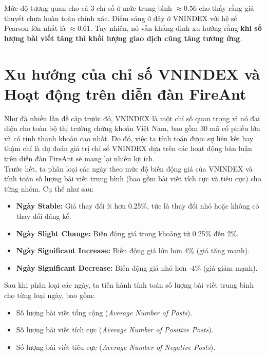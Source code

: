 Mức độ tương quan cho cả 3 chỉ số ở mức trung bình $ \approx 0.56 $ cho thấy rằng giả thuyết chưa hoàn toàn chính xác. Điểm sáng ở đây ở VNINDEX với hệ số Pearson lớn nhất là $ \approx 0.61 $. Tuy nhiên, nó vẫn khẳng định xu hướng rằng \textbf{khi số lượng bài viết tăng thì khối lượng giao dịch cũng tăng tương ứng}.

\section{Xu hướng của chỉ số VNINDEX và Hoạt động trên diễn đàn FireAnt}
Như đã nhiều lần đề cập trước đó, VNINDEX là một chỉ số quan trọng vì nó đại diện cho toàn bộ thị trường chứng khoán Việt Nam, bao gồm 30 mã cổ phiếu lớn và có tính thanh khoản cao nhất. Do đó, việc ta tính toán được sự liên kết hay thậm chí là dự đoán giá trị chỉ số VNINDEX dựa trên các hoạt động bàn luận trên diễn đàn FireAnt sẽ mang lại nhiều lợi ích.\\

Trước hết, ta phân loại các ngày theo mức độ biến động giá của VNINDEX và tính toán số lượng bài viết trung bình (bao gồm bài viết tích cực và tiêu cực) cho từng nhóm. Cụ thể như sau:

\begin{itemize}
    \item \textbf{Ngày Stable:} Giá thay đổi ít hơn 0.25\%, tức là thay đổi nhỏ hoặc không có thay đổi đáng kể.
    \item \textbf{Ngày Slight Change:} Biến động giá trong khoảng từ 0.25\% đến 2\%.
    \item \textbf{Ngày Significant Increase:} Biến động giá lớn hơn 4\% (giá tăng mạnh).
    \item \textbf{Ngày Significant Decrease:} Biến động giá nhỏ hơn -4\% (giá giảm mạnh).
\end{itemize}

Sau khi phân loại các ngày, ta tiến hành tính toán số lượng bài viết trung bình cho từng loại ngày, bao gồm:

\begin{itemize}
    \item Số lượng bài viết tổng cộng (\textit{Average Number of Posts}).
    \item Số lượng bài viết tích cực (\textit{Average Number of Positive Posts}).
    \item Số lượng bài viết tiêu cực (\textit{Average Number of Negative Posts}).
\end{itemize}

